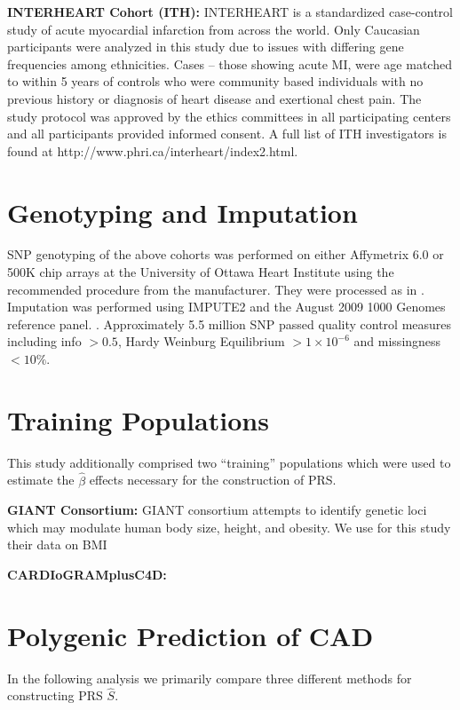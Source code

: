 \textbf{INTERHEART Cohort (ITH):} INTERHEART is a standardized case-control study of acute myocardial infarction from across the world. Only Caucasian participants were analyzed in this study due to issues with differing gene frequencies among ethnicities. Cases -- those showing acute MI, were age matched to within 5 years of controls who were community based individuals with no previous history or diagnosis of heart disease and exertional chest pain. The study protocol was approved by the ethics committees in all participating centers and all participants provided informed consent. A full list of ITH investigators is found at http://www.phri.ca/interheart/index2.html.

\section{Genotyping and Imputation}

SNP genotyping of the above cohorts was performed on either Affymetrix 6.0 or 500K chip arrays at the University of Ottawa Heart Institute using the recommended procedure from the manufacturer. They were processed as in \cite{Dandona2010,Schunkert2011}. Imputation was performed using IMPUTE2 and the August 2009 1000 Genomes reference panel. \citep{10.1371/journal.pgen.1000529}. Approximately 5.5 million \ac{SNP} passed quality control measures including info $> 0.5$, Hardy Weinburg Equilibrium $> 1 \times 10^{-6}$ and missingness $< 10\%$. 


\section{Training Populations}

This study additionally comprised two ``training'' populations which were used to estimate the $\hat{\beta}$ effects necessary for the construction of \ac{PRS}.

\textbf{GIANT Consortium: } \ac{GIANT} consortium attempts to identify genetic loci which may modulate human body size, height, and obesity. We use for this study their data on BMI 


\textbf{CARDIoGRAMplusC4D:} 


\section{Polygenic Prediction of CAD}

In the following analysis we primarily compare three different methods for constructing \ac{PRS} $\hat{S}$.

